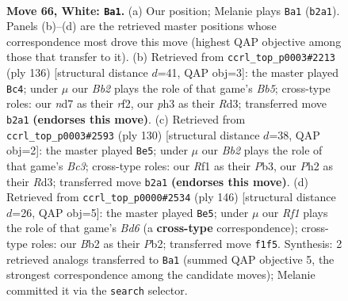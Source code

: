 \documentclass[11pt]{article}
\begin{document}
\clearpage

\begin{figure}[p]\centering
\begin{subfigure}{0.46\textwidth}\centering
\resizebox{\linewidth}{!}{%
\newchessgame
\chessboard[
  setfen={6k1/3nr3/6P1/8/p1p5/P1P4p/1BP4P/5R1K w - - 21 66},
  showmover=false,
  pgfstyle=straightmove, color=movearrow, markmove={b2-a1}
]}
\caption{}
\end{subfigure}\hfill
\begin{subfigure}{0.46\textwidth}\centering
\resizebox{\linewidth}{!}{%
\newchessgame
\chessboard[
  setfen={8/1p2k3/8/pBpPb3/P6K/1P1R4/5r2/8 w - - 1 69},
  showmover=false,
  pgfstyle=straightmove, color=movearrow, markmove={b5-c4}
]}
\caption{}
\end{subfigure}
\\[4pt]
\begin{subfigure}{0.46\textwidth}\centering
\resizebox{\linewidth}{!}{%
\newchessgame
\chessboard[
  setfen={4r3/1p6/p5k1/P1KP1n2/5P2/1PBR2p1/8/8 w - - 0 66},
  showmover=false,
  pgfstyle=straightmove, color=movearrow, markmove={c3-e5}
]}
\caption{}
\end{subfigure}\hfill
\begin{subfigure}{0.46\textwidth}\centering
\resizebox{\linewidth}{!}{%
\newchessgame
\chessboard[
  setfen={2k5/8/p1pBn1p1/7p/PK2P2P/6P1/1P6/8 w - - 45 74},
  showmover=false,
  pgfstyle=straightmove, color=movearrow, markmove={d6-e5}
]}
\caption{}
\end{subfigure}
\caption{\textbf{Move 66, White: \texttt{Ba1}.} (a) Our position; Melanie plays \texttt{Ba1} (\texttt{b2a1}). Panels (b)--(d) are the retrieved master positions whose correspondence most drove this move (highest QAP objective among those that transfer to it). (b) Retrieved from \texttt{ccrl\_top\_p0003\#2213} (ply 136) [structural distance $d$=41, QAP obj=3]: the master played \texttt{Bc4}; under $\mu$ our \emph{Bb2} plays the role of that game's \emph{Bb5}; cross-type roles: our \emph{n}d7 as their \emph{r}f2, our \emph{p}h3 as their \emph{R}d3; transferred move \texttt{b2a1} \textbf{(endorses this move)}. (c) Retrieved from \texttt{ccrl\_top\_p0003\#2593} (ply 130) [structural distance $d$=38, QAP obj=2]: the master played \texttt{Be5}; under $\mu$ our \emph{Bb2} plays the role of that game's \emph{Bc3}; cross-type roles: our \emph{R}f1 as their \emph{P}b3, our \emph{P}h2 as their \emph{R}d3; transferred move \texttt{b2a1} \textbf{(endorses this move)}. (d) Retrieved from \texttt{ccrl\_top\_p0000\#2534} (ply 146) [structural distance $d$=26, QAP obj=5]: the master played \texttt{Be5}; under $\mu$ our \emph{Rf1} plays the role of that game's \emph{Bd6} (a \textbf{cross-type} correspondence); cross-type roles: our \emph{B}b2 as their \emph{P}b2; transferred move \texttt{f1f5}. Synthesis: 2 retrieved analogs transferred to \texttt{Ba1} (summed QAP objective 5, the strongest correspondence among the candidate moves); Melanie committed it via the \texttt{search} selector.}
\label{fig:thought-m130}
\end{figure}
\end{document}
